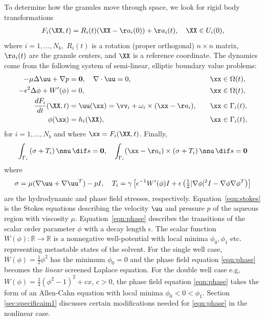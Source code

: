 To determine how the granules move through space,
we look for rigid body transformations
\begin{align}
\label{eq:RBT}
  F_i(\XX,t) = R_i(t)(\XX - \aa_i(0)) + \aa_i(t),\quad \XX \in U_i(0),
\end{align}
where $i = 1,\ldots,N_b,$ $R_i(t)$ is a rotation (proper orthogonal) $n
\times n$ matrix, $\aa_i(t)$ are the granule centers, and $\XX$ is a
reference coordinate.
The dynamics come from the following system of semi-linear, elliptic boundary value problems:
\begin{alignat}{4}
  \label{eqn:stokes} 
  -\mu\Delta \uu + \nabla p &= \mathbf{0}, 
  \quad \nabla \cdot \uu = 0, &&\xx \in \Omega(t), \\
  \label{eqn:phase}
  -\epsilon^2 \Delta \phi + W'(\phi) &= 0, &&\xx \in \Omega(t),\\
  \label{eqn:noslip}        
  \frac{dF_i}{dt}(\XX,t) & = \uu(\xx) = 
    \vv_i + \omega_i \times (\xx - \aa_i), 
  \quad &&\xx \in \Gamma_i(t),\\
  \label{eqn:material}
  \phi(\xx) &= h_i(\XX),  &&\xx \in \Gamma_i(t),
\end{alignat}
for $i=1,\ldots,N_b$ and where $\xx = F_i(\XX,t)$.  Finally,
\begin{align}
\label{eqn:stressbalance}
\int_{\Gamma_i} \left(\sigma  + T_i\right)\nnu \,\dif s = \mathbf{0},\quad
\int_{\Gamma_i} (\xx - \aa_i)\times \left(\sigma + T_i\right) \nnu \,\dif s = \mathbf{0}
\end{align}
where
\begin{align}
\label{eqn:hydro_stress}
\sigma = \mu(\nabla \uu + \nabla \uu^T) - pI,\quad 
T_i = \gamma\left[\epsilon^{-1} W'(\phi)I
  + \epsilon\left(\tfrac{1}{2}|\nabla \phi|^2I - \nabla \phi \nabla
  \phi^T\right)\right]
\end{align}
are the hydrodynamic and phase field stresses, respectively.
Equation~\eqref{eqn:stokes} is the Stokes equations 
describing the velocity $\uu$ and pressure $p$ of the aqueous region with
viscosity $\mu$.
Equation~\eqref{eqn:phase} describes the
transitions of the scalar order parameter $\phi$ with a decay length
$\epsilon$.
The scalar function $W(\phi) : \mathbb{R} \to \mathbb{R}$ is a nonnegative
well-potential with local minima $\phi_0, \phi_1$  etc.
representing metastable states of the solvent.
For the single well case, $W(\phi) = \frac{1}{2}\phi^2$
has the minimum $\phi_0 = 0$ and the phase field equation
\eqref{eqn:phase} becomes the \emph{linear} screened Laplace equation.
For the double well case e.g, $W(\phi) = \frac{1}{4}(\phi^2-1)^2+cx$, $c > 0$,
the phase field equation \eqref{eqn:phase} takes the form of an
Allen-Cahn equation with local minima $\phi_0 < 0 < \phi_1$.
Section \ref{sec:specificaim1} discusses certain
modifications needed for \eqref{eqn:phase} in the nonlinear case.


